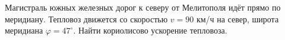 Магистраль южных железных дорог к северу от Мелитополя идёт прямо по
меридиану. Тепловоз движется со скоростью $v=90$ км/ч на север, широта
меридиана $\varphi=47^\circ$. Найти кориолисово ускорение тепловоза.
